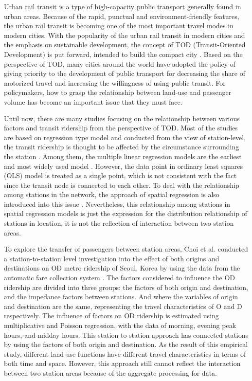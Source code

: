 \documentclass[utf8]{article}
\begin{document}
%
Urban rail transit is a type of high-capacity public transport generally found in urban areas. Because of the rapid, punctual and environment-friendly features, the urban rail transit is becoming one of the most important travel modes in modern cities. With the popularity of the urban rail transit in modern cities and the emphasis on sustainable development, the concept of TOD (Transit-Oriented Development) is put forward, intended to build the compact city \cite{calthorpe1993next}. Based on the perspective of TOD, many cities around the world have adopted the policy of giving priority to the development of public transport for decreasing the share of motorized travel and increasing the willingness of using public transit. For policymakers, how to grasp the relationship between land-use and passenger volume has become an important issue that they must face.

%
Until now, there are many studies focusing on the relationship between various factors and transit ridership from the perspective of TOD. Most of the studies are based on regression type model and conducted from the view of station-level, the transit ridership is thought to be affected by the circumstance surrounding the station \cite{cervero1997travel,taylor2003analyzing,zhao2005transit,estupinan2008relationship,taylor2009nature,sohn2010factors,gutierrez2011transit,jun2015land}. Among them, the multiple linear regression models are the earliest and most widely used model \cite{cervero1997travel,gutierrez2011transit}. However, the data point in ordinary least squares (OLS) model is treated as a single point, which is not consistent with the fact since the transit node is connected to each other. To deal with the relationship among stations in the network, the approach of spatial regression is also introduced into this issue \cite{cardozo2012application,jun2015land}. Nevertheless, this relationship among stations in spatial regression models is just the expression for the distribution relationship of stations in location, it is not the reflection of interaction between two station areas.

%
To explore the transfer of passengers between station areas, Choi et al. conducted a station-to-station level investigation into the effect of both origins and destinations on OD metro ridership of Seoul, Korea by using the data from the automatic fare collection system \cite{choi2012analysis}. The factors considered to influence the OD ridership are divided into three groups: the factors of both origin and destination, and the impedance factors between stations. And where the variables of origin and destination are the same, representing the travel characteristics of O and D respectively. The influence of factors on OD ridership is estimated using multiplicative and Poisson regression, with the data of morning, evening peak hours, and midday hours. This station-to-station approach has connected stations by using the factors of both origin and destination. As the result of this empirical study, different land-use functions have different travel characteristics in terms of both time and space. However, this approach still cannot reflect the interaction between two station areas because of the aggregate processing for data.
\end{document}
